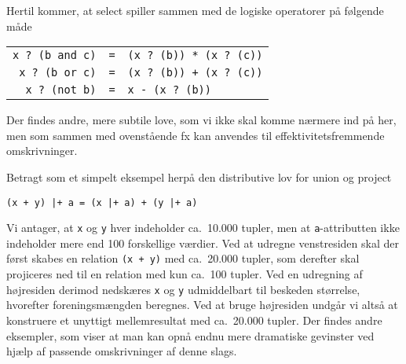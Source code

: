 Hertil kommer, at select spiller sammen med de logiske operatorer
p\aa{} f\o{}lgende m\aa{}de
\begin{center}
\begin{tabular}{rcl}
\verb"x ? (b and c)" & \verb"=" & \verb"(x ? (b)) * (x ? (c))"\\
\verb"x ? (b or c)" & \verb"=" & \verb"(x ? (b)) + (x ? (c))"\\
\verb"x ? (not b)" & \verb"=" & \verb"x - (x ? (b))"
\end{tabular}
\end{center}
Der findes andre, mere subtile love, som vi ikke skal komme n\ae{}rmere
ind p\aa{} her, men som sammen med ovenst\aa{}ende fx kan anvendes til
effektivitetsfremmende omskrivninger.

Betragt som et simpelt eksempel herp\aa{} den distributive lov for
union og project
\begin{center}
\verb"(x + y) |+ a = (x |+ a) + (y |+ a)"
\end{center}
Vi antager, at \verb"x" og \verb"y" hver indeholder ca.\ 10.000 tupler,
men at \verb"a"-attribut\-ten ikke indeholder mere end 100 forskellige
v\ae{}rdier. Ved at udregne venstresiden skal der f\o{}rst skabes en
relation \verb"(x + y)" med ca.\ 20.000 tupler, som derefter
skal projiceres ned til en relation med kun ca.\ 100 tupler.
Ved en udregning af h\o{}jresiden derimod nedsk\ae{}res \verb"x" og
\verb"y" udmiddelbart til beskeden st\o{}rrelse, hvorefter
foreningsm\ae{}ngden beregnes. Ved at bruge h\o{}jresiden undg\aa{}r
vi alts\aa{} at konstruere et unyttigt mellemresultat med ca.\
20.000 tupler. Der findes andre eksempler, som viser at man kan opn\aa{}
endnu mere dramatiske gevinster ved hj\ae{}lp af passende omskrivninger
af denne slags.


